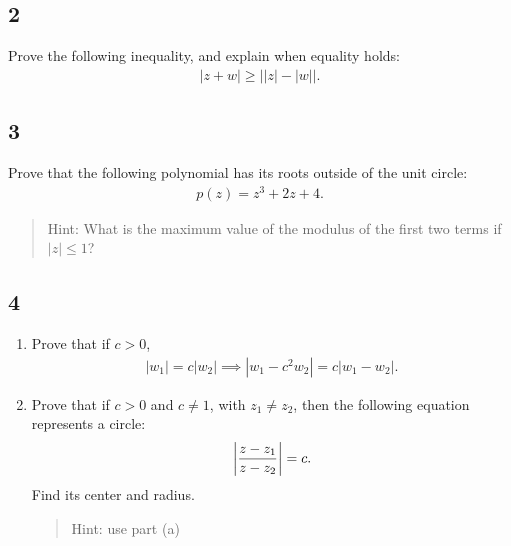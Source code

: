 \hypertarget{section-27}{%
\subsection{2}\label{section-27}}

Prove the following inequality, and explain when equality holds:
\begin{align*}
{\left\lvert {z+w} \right\rvert} \geq {\left\lvert { {\left\lvert {z} \right\rvert} - {\left\lvert {w} \right\rvert} } \right\rvert}
.\end{align*}

\hypertarget{section-28}{%
\subsection{3}\label{section-28}}

Prove that the following polynomial has its roots outside of the unit
circle:
\begin{align*}
p(z) = z^3 + 2z + 4
.\end{align*}

\begin{quote}
Hint: What is the maximum value of the modulus of the first two terms if
\({\left\lvert {z} \right\rvert} \leq 1\)?
\end{quote}

\hypertarget{section-29}{%
\subsection{4}\label{section-29}}

\begin{enumerate}
\def\labelenumi{\alph{enumi}.}
\item
  Prove that if \(c>0\),
  \begin{align*}
  {\left\lvert {w_1} \right\rvert} = c{\left\lvert {w_2} \right\rvert} \implies {\left\lvert {w_1 - c^2 w_2} \right\rvert} = c{\left\lvert {w_1 - w_2} \right\rvert}
  .\end{align*}
\item
  Prove that if \(c>0\) and \(c\neq 1\), with \(z_1\neq z_2\), then the
  following equation represents a circle:
  \begin{align*}
   {\left\lvert {z-z_1 \over z-z_2} \right\rvert} = c
   .\end{align*}
  Find its center and radius.

  \begin{quote}
  Hint: use part (a)
  \end{quote}
\end{enumerate}

